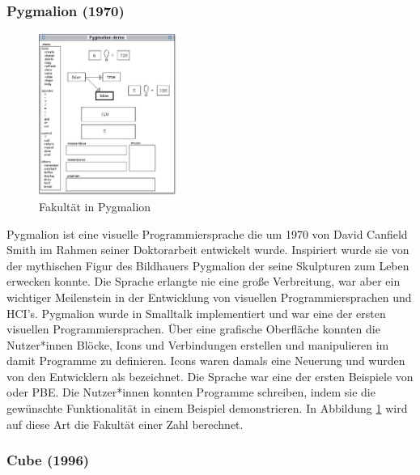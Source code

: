 \documentclass[ngerman]{article}
\begin{document}
\subsubsection{Pygmalion (1970)}
\begingroup
\setlength\intextsep{2pt}
\begin{minipage}{\linewidth}
\begin{figure}
  \centering
  \includegraphics[width=0.4\textwidth]{./graphics/pygmalion.jpg} %
  \caption{Fakultät in Pygmalion \cite{smith1975pygmalion}}
  \label{fig:pygmalion_demo}
\end{figure}

Pygmalion ist eine visuelle Programmiersprache die um 1970 von David Canfield Smith im Rahmen seiner Doktorarbeit entwickelt wurde. Inspiriert wurde sie von der mythischen Figur des Bildhauers Pygmalion der seine Skulpturen zum Leben erwecken konnte.
Die Sprache erlangte nie eine große Verbreitung, war aber ein wichtiger Meilenstein in der Entwicklung von visuellen Programmiersprachen und HCI's.
Pygmalion wurde in Smalltalk implementiert und war eine der ersten visuellen Programmiersprachen. Über eine grafische Oberfläche konnten die Nutzer*innen Blöcke, Icons und Verbindungen erstellen und manipulieren im damit Programme zu definieren.
  Icons waren damals eine Neuerung und wurden von den Entwicklern als  bezeichnet. 
  Die Sprache war eine der ersten Beispiele von  oder PBE.
Die Nutzer*innen konnten Programme schreiben, indem sie die gewünschte Funktionalität in einem Beispiel demonstrieren. 
In Abbildung \ref{fig:pygmalion_demo} wird auf diese Art die Fakultät einer Zahl berechnet. 

\end{minipage}
\endgroup

\subsubsection{Cube (1996)}
\end{document}
